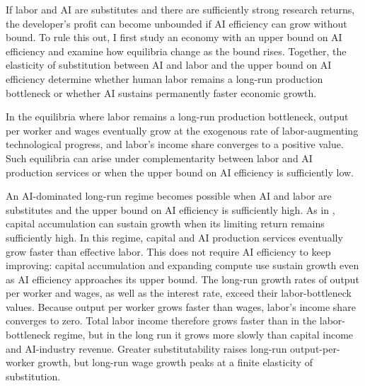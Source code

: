 If labor and AI are substitutes and there are sufficiently strong research returns, the developer's profit can become unbounded if AI efficiency can grow without bound. To rule this out, I first study an economy with an upper bound on AI efficiency and examine how equilibria change as the bound rises. Together, the elasticity of substitution between AI and labor and the upper bound on AI efficiency determine whether human labor remains a long-run production bottleneck or whether AI sustains permanently faster economic growth. %

In the equilibria where labor remains a long-run production bottleneck, output per worker and wages eventually grow at the exogenous rate of labor-augmenting technological progress, and labor's income share converges to a positive value. Such equilibria can arise under complementarity between labor and AI production services or when the upper bound on AI efficiency is sufficiently low.

An AI-dominated long-run regime becomes possible when AI and labor are substitutes and the upper bound on AI efficiency is sufficiently high. As in \citet{jonesmanuelli1990}, capital accumulation can sustain growth when its limiting return remains sufficiently high. In this regime, capital and AI production services eventually grow faster than effective labor. This does not require AI efficiency to keep improving: capital accumulation and expanding compute use sustain growth even as AI efficiency approaches its upper bound. The long-run growth rates of output per worker and wages, as well as the interest rate, exceed their labor-bottleneck values. Because output per worker grows faster than wages, labor's income share converges to zero. %
Total labor income therefore grows faster than in the labor-bottleneck regime, but in the long run it grows more slowly than capital income and AI-industry revenue. Greater substitutability raises long-run output-per-worker growth, but long-run wage growth peaks at a finite elasticity of substitution.

